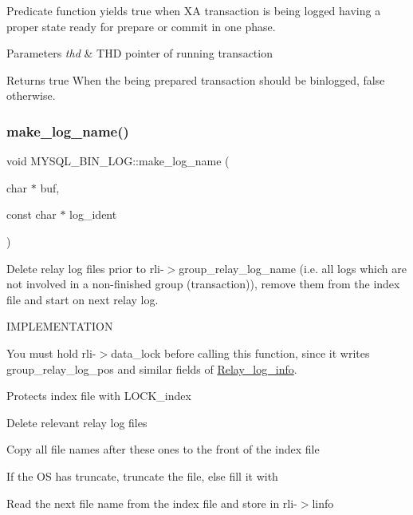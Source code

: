 Predicate function yields true when XA transaction is being logged having a proper state ready for prepare or commit in one phase.


\begin{DoxyParams}{Parameters}
{\em thd} & T\+HD pointer of running transaction \\
\hline
\end{DoxyParams}
\begin{DoxyReturn}{Returns}
true When the being prepared transaction should be binlogged, false otherwise. 
\end{DoxyReturn}
\mbox{\label{group__Binary__Log_ga94f694096c1ef28962d9d7936d2d9a1e}} 
\subsubsection{\texorpdfstring{make\+\_\+log\+\_\+name()}{make\_log\_name()}}
{\footnotesize\ttfamily void M\+Y\+S\+Q\+L\+\_\+\+B\+I\+N\+\_\+\+L\+O\+G\+::make\+\_\+log\+\_\+name (\begin{DoxyParamCaption}\item[{char $\ast$}]{buf,  }\item[{const char $\ast$}]{log\+\_\+ident }\end{DoxyParamCaption})}

Delete relay log files prior to rli-\/$>$group\+\_\+relay\+\_\+log\+\_\+name (i.\+e. all logs which are not involved in a non-\/finished group (transaction)), remove them from the index file and start on next relay log.

I\+M\+P\+L\+E\+M\+E\+N\+T\+A\+T\+I\+ON


\begin{DoxyItemize}
\item You must hold rli-\/$>$data\+\_\+lock before calling this function, since it writes group\+\_\+relay\+\_\+log\+\_\+pos and similar fields of \mbox{\hyperlink{classRelay__log__info}{Relay\+\_\+log\+\_\+info}}.
\item Protects index file with L\+O\+C\+K\+\_\+index
\item Delete relevant relay log files
\item Copy all file names after these ones to the front of the index file
\item If the OS has truncate, truncate the file, else fill it with ~\newline
\textquotesingle{}
\item Read the next file name from the index file and store in rli-\/$>$linfo
\end{DoxyItemize}



